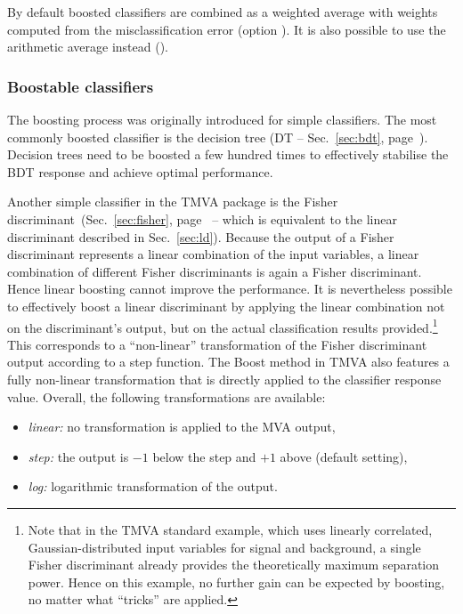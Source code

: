 By default boosted classifiers are combined as a weighted average with 
weights computed from the misclassification error (option
). It is also possible to use
the arithmetic average instead ().

\subsubsection{Boostable classifiers}

The boosting process was originally introduced for  simple classifiers.  
The most commonly boosted classifier is the decision tree (DT -- \cf Sec.~\ref{sec:bdt}, 
page~\pageref{sec:bdt}). Decision trees need to be boosted a few hundred
times to effectively stabilise the BDT response and achieve optimal 
performance. 

Another simple classifier in the TMVA package is the Fisher
discriminant~(\cf Sec.~\ref{sec:fisher}, page~\pageref{sec:fisher} -- which is equivalent
to the linear discriminant described in Sec.~\ref{sec:ld}). Because the output 
of a Fisher discriminant represents a linear combination of the input variables, 
a linear combination of different Fisher discriminants is again a Fisher 
discriminant. Hence linear boosting cannot improve the performance. It is
nevertheless possible to effectively boost a linear discriminant by applying
the linear combination not on the discriminant's output, but on the actual
classification results provided.\footnote
{
   Note that in the TMVA standard example, which uses linearly correlated, 
   Gaussian-distributed input variables for signal and background, a
   single Fisher discriminant already provides the theoretically maximum 
   separation power. Hence on this example, no further gain can be
   expected by boosting, no matter what ``tricks'' are applied.
} 
This corresponds to a ``non-linear'' transformation of the
Fisher discriminant output according to a step function. The Boost 
method in TMVA also features a fully non-linear transformation that is 
directly applied to the classifier response value. Overall, the following
transformations are available:
\begin{itemize}
\item{\em linear:} no transformation is applied to the MVA output,
\item{\em step:}   the output is $-1$ below the step
                   and $+1$ above (default setting),
\item{\em log:}    logarithmic transformation of the output.
\end{itemize}

